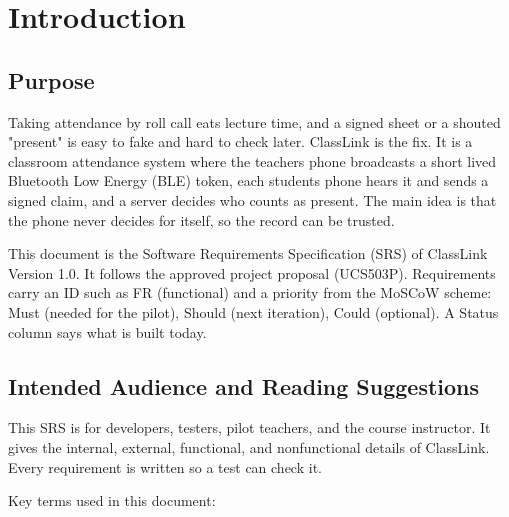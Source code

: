 \hypertarget{introduction}{%
\section{Introduction}\label{introduction}}

\hypertarget{purpose}{%
\subsection{Purpose}\label{purpose}}

Taking attendance by roll call eats lecture time, and a signed sheet or a shouted "present" is easy to fake and hard to check later. ClassLink is the fix. It is a classroom attendance system where the teacher\textquotesingle s phone broadcasts a short lived Bluetooth Low Energy (BLE) token, each student\textquotesingle s phone hears it and sends a signed claim, and a server decides who counts as present. The main idea is that the phone never decides for itself, so the record can be trusted.

This document is the Software Requirements Specification (SRS) of ClassLink Version 1.0. It follows the approved project proposal (UCS503P). Requirements carry an ID such as FR (functional) and a priority from the MoSCoW scheme: Must (needed for the pilot), Should (next iteration), Could (optional). A Status column says what is built today.

\hypertarget{intended-audience-and-reading-suggestions}{%
\subsection{Intended Audience and Reading Suggestions}\label{intended-audience-and-reading-suggestions}}

This SRS is for developers, testers, pilot teachers, and the course instructor. It gives the internal, external, functional, and nonfunctional details of ClassLink. Every requirement is written so a test can check it.

Key terms used in this document:

